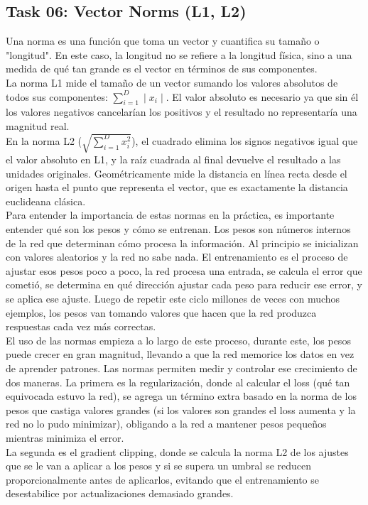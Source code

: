 \documentclass[12pt]{article}
\begin{document}
\subsection*{Task 06: Vector Norms (L1, L2)}
Una norma es una función que toma un vector y cuantifica su tamaño o "longitud". En este caso, la longitud no se 
refiere a la longitud física, sino a una medida de qué tan grande es el vector en términos de sus componentes. \\
La norma L1 mide el tamaño de un vector sumando los valores absolutos de todos sus componentes: $\displaystyle \sum_{i=1}^{D} \mid x_i \mid$.
El valor absoluto es necesario ya que sin él los valores negativos cancelarían los positivos y el resultado no representaría una magnitud real.\\
En la norma L2 \Bigg($\displaystyle \sqrt{\sum_{i=1}^{D} x_i^2}$\Bigg), el cuadrado elimina los signos negativos igual que el valor absoluto en L1, y la raíz cuadrada al final devuelve el resultado a las
unidades originales. Geométricamente mide la distancia en línea recta desde el origen hasta el punto que representa el vector, que es exactamente la 
distancia euclideana clásica. \\
Para entender la importancia de estas normas en la práctica, es importante entender qué son los pesos y cómo se entrenan. Los pesos son números internos
de la red que determinan cómo procesa la información. Al principio se inicializan con valores aleatorios y la red no sabe nada. El entrenamiento es el 
proceso de ajustar esos pesos poco a poco, la red procesa una entrada, se calcula el error que cometió, se determina en qué dirección ajustar cada peso 
para reducir ese error, y se aplica ese ajuste. Luego de repetir este ciclo millones de veces con muchos ejemplos, los pesos van tomando valores que hacen
que la red produzca respuestas cada vez más correctas.\\
El uso de las normas empieza a lo largo de este proceso, durante este, los pesos puede crecer en gran magnitud, llevando a que la red memorice los datos en vez
de aprender patrones. Las normas permiten medir y controlar ese crecimiento de dos maneras. La primera es la regularización, donde al calcular el loss (qué tan equivocada
estuvo la red), se agrega un término extra basado en la norma de los pesos que castiga valores grandes (si los valores son grandes el loss aumenta y la red no lo pudo minimizar),
obligando a la red a mantener pesos pequeños mientras minimiza el error. \\
La segunda es el gradient clipping, donde se calcula la norma L2 de los ajustes que se le van a aplicar a los pesos y si se supera un umbral se reducen proporcionalmente antes de
 aplicarlos, evitando que el entrenamiento se desestabilice por actualizaciones demasiado grandes. 
\end{document}
